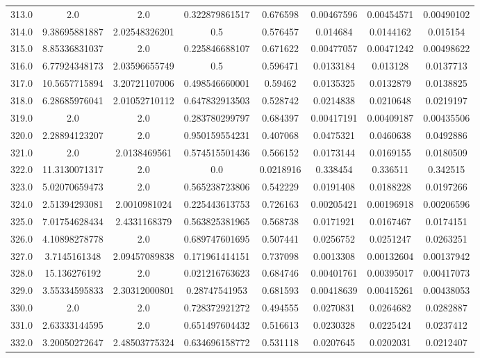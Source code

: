 \begin{longtable}{|c|c|c|c|c|c|c|c|}
313.0 & 2.0 & 2.0 & 0.322879861517 & 0.676598 & 0.00467596 & 0.00454571 & 0.00490102 \\
314.0 & 9.38695881887 & 2.02548326201 & 0.5 & 0.576457 & 0.014684 & 0.0144162 & 0.015154 \\
315.0 & 8.85336831037 & 2.0 & 0.225846688107 & 0.671622 & 0.00477057 & 0.00471242 & 0.00498622 \\
316.0 & 6.77924348173 & 2.03596655749 & 0.5 & 0.596471 & 0.0133184 & 0.013128 & 0.0137713 \\
317.0 & 10.5657715894 & 3.20721107006 & 0.498546660001 & 0.59462 & 0.0135325 & 0.0132879 & 0.0138825 \\
318.0 & 6.28685976041 & 2.01052710112 & 0.647832913503 & 0.528742 & 0.0214838 & 0.0210648 & 0.0219197 \\
319.0 & 2.0 & 2.0 & 0.283780299797 & 0.684397 & 0.00417191 & 0.00409187 & 0.00435506 \\
320.0 & 2.28894123207 & 2.0 & 0.950159554231 & 0.407068 & 0.0475321 & 0.0460638 & 0.0492886 \\
321.0 & 2.0 & 2.0138469561 & 0.574515501436 & 0.566152 & 0.0173144 & 0.0169155 & 0.0180509 \\
322.0 & 11.3130071317 & 2.0 & 0.0 & 0.0218916 & 0.338454 & 0.336511 & 0.342515 \\
323.0 & 5.02070659473 & 2.0 & 0.565238723806 & 0.542229 & 0.0191408 & 0.0188228 & 0.0197266 \\
324.0 & 2.51394293081 & 2.0010981024 & 0.225443613753 & 0.726163 & 0.00205421 & 0.00196918 & 0.00206596 \\
325.0 & 7.01754628434 & 2.4331168379 & 0.563825381965 & 0.568738 & 0.0171921 & 0.0167467 & 0.0174151 \\
326.0 & 4.10898278778 & 2.0 & 0.689747601695 & 0.507441 & 0.0256752 & 0.0251247 & 0.0263251 \\
327.0 & 3.7145161348 & 2.09457089838 & 0.171961414151 & 0.737098 & 0.0013308 & 0.00132604 & 0.00137942 \\
328.0 & 15.136276192 & 2.0 & 0.021216763623 & 0.684746 & 0.00401761 & 0.00395017 & 0.00417073 \\
329.0 & 3.55334595833 & 2.30312000801 & 0.28747541953 & 0.681593 & 0.00418639 & 0.00415261 & 0.00438053 \\
330.0 & 2.0 & 2.0 & 0.728372921272 & 0.494555 & 0.0270831 & 0.0264682 & 0.0282887 \\
331.0 & 2.63333144595 & 2.0 & 0.651497604432 & 0.516613 & 0.0230328 & 0.0225424 & 0.0237412 \\
332.0 & 3.20050272647 & 2.48503775324 & 0.634696158772 & 0.531118 & 0.0207645 & 0.0202031 & 0.0212407 \\

\end{longtable}
